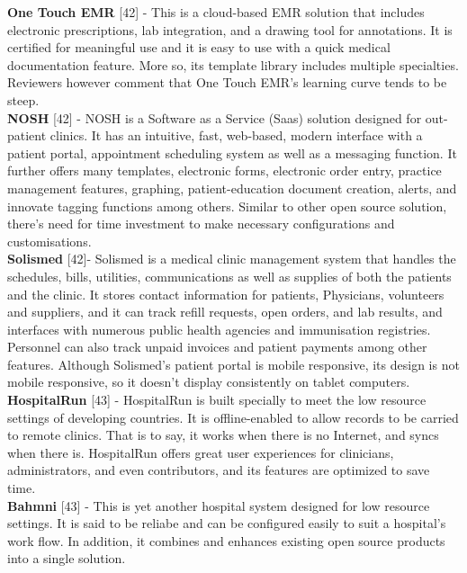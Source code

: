 \documentclass[a4paper]{article}
\begin{document}
{\bf One Touch EMR} [42] - This is a cloud-based EMR solution that includes electronic prescriptions, lab integration, and a drawing tool for annotations. It is certified for meaningful use and it is easy to use with a quick medical documentation feature. More so, its template library includes multiple specialties. Reviewers however comment that One Touch EMR's learning curve tends to be steep.\\

{\bf NOSH} [42] - NOSH is a Software as a Service (Saas) solution designed for out-patient clinics. It has an intuitive, fast, web-based, modern interface with a patient portal, appointment scheduling system as well as a messaging function. It further offers many templates, electronic forms, electronic order entry, practice management features, graphing, patient-education document creation, alerts, and innovate tagging functions among others. Similar to other open source solution, there’s need for time investment to make necessary configurations and customisations. \\

{\bf Solismed} [42]- Solismed is a medical clinic management system that handles the schedules, bills, utilities, communications as well as supplies of both the patients and the clinic. It stores contact information for patients, Physicians, volunteers and suppliers, and it can track refill requests, open orders, and lab results, and interfaces with numerous public health agencies and immunisation registries. Personnel can also track unpaid invoices and patient payments among other features. Although Solismed’s patient portal is mobile responsive,  its design is not mobile responsive, so it doesn’t display consistently on tablet computers.\\

{\bf HospitalRun} [43] - HospitalRun is built specially to meet the low resource settings of developing countries. It is offline-enabled to allow records to be carried to remote clinics. That is to say, it works when there is no Internet, and syncs when there is. HospitalRun offers great user experiences for clinicians, administrators, and even contributors, and its features are optimized to save time.\\

{\bf Bahmni} [43] - This is yet another hospital system designed for low resource settings. It is said to be reliabe and can be configured easily to suit a hospital's work flow. In addition, it combines and enhances existing open source products into a single solution.\\
\end{document}
